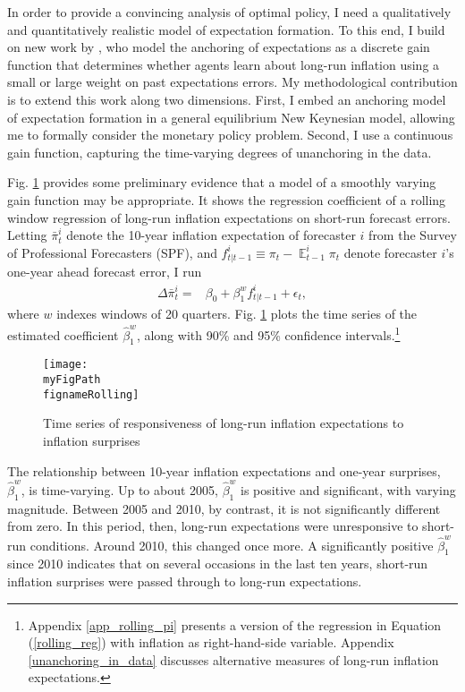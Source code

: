\documentclass[11pt]{article}
\def \myFigPath {../../figures/}
\renewcommand{\[}{\begin{equation}}
\renewcommand{\]}{\end{equation}}
\DeclareMathOperator{\E}{\mathbb{E}}
\def\fignameRolling{rolling_overlapping_command_anchoring_in_data_individual_23_Sep_2020_21_04_48}
\begin{document}
In order to provide a convincing analysis of optimal policy, I need a qualitatively and quantitatively realistic model of expectation formation. To this end, I build on new work by \cite{carvalho2019anchored}, who model the anchoring of expectations as a discrete gain function that determines whether agents learn about long-run inflation using a small or large weight on past expectations errors. My methodological contribution is to extend this work along two dimensions. First, I embed an anchoring model of expectation formation in a general equilibrium New Keynesian model, allowing me to formally consider the monetary policy problem. Second, I use a continuous gain function, capturing the time-varying degrees of unanchoring in the data.

Fig. \ref{rolling} provides some preliminary evidence that a model of a smoothly varying gain function may be appropriate. It shows the regression coefficient of a rolling window regression of long-run inflation expectations on short-run forecast errors. Letting $\bar{\pi}^i_t$ denote the 10-year inflation expectation of forecaster $i$ from the Survey of Professional Forecasters (SPF), and $f^i_{t|t-1} \equiv \pi_t - \E^i_{t-1}\pi_t$ denote forecaster $i$'s one-year ahead forecast error, I run
\begin{align}
\Delta\bar{\pi}^i_t = & \beta_0 + \beta^w_1 f^i_{t|t-1} + \epsilon_t, 
\label{rolling_reg}
\end{align}
where $w$ indexes windows of 20 quarters. Fig. \ref{rolling} plots the time series of the estimated coefficient $\hat{\beta}^w_1$, along with 90\% and 95\% confidence intervals.\footnote{Appendix \ref{app_rolling_pi} presents a version of the regression in Equation (\ref{rolling_reg}) with inflation as right-hand-side variable. Appendix \ref{unanchoring_in_data} discusses alternative measures of long-run inflation expectations.}
\begin{figure}[h!]
\texttt{[image: \\myFigPath \\fignameRolling]}
\caption{Time series of responsiveness of long-run inflation expectations to inflation surprises}
\label{rolling}
\end{figure}

The relationship between 10-year inflation expectations and one-year surprises, $\hat{\beta}^w_1$, is time-varying. Up to about 2005, $\hat{\beta}^w_1$ is positive and significant, with varying magnitude. Between 2005 and 2010, by contrast, it is not significantly different from zero. In this period, then, long-run expectations were unresponsive to short-run conditions. Around 2010, this changed once more. A significantly positive $\hat{\beta}^w_1$ since 2010 indicates that on several occasions in the last ten years, short-run inflation surprises were passed through to long-run expectations. 
\end{document}
